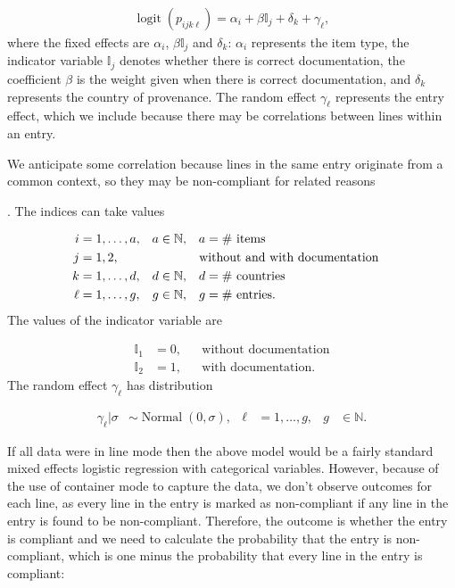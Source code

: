 \documentclass{article}
\newif\ifproofread
\newcommand{\rev}[1]{%
\ifproofread
\hl{#1}%
\else
#1%
\fi
}
\DeclareMathOperator{\logit}{logit}
\DeclareMathOperator{\Normal}{Normal}
\begin{document}
\begin{align}
\logit(p_{ijk\ell}) = \alpha_{i} + \beta\mathbb{I}_j + \delta_k + \gamma_\ell \label{eq:logit_model_sim},
\end{align}
where the fixed effects are $\alpha_i$, $\beta\mathbb{I}_j$ and $\delta_k$: $\alpha_i$ represents the item type, the indicator variable $\mathbb{I}_j$ denotes whether there is correct documentation, the coefficient $\beta$ is the weight given when there is correct documentation, and $\delta_k$ represents the country of provenance. The random effect $\gamma_\ell$ represents the entry effect, which we include because there may be correlations between lines within an entry. \rev{We anticipate some correlation because lines in the same entry originate from a common context, so they may be non-compliant for related reasons}. The indices can take values

\begin{align}
i &=1, \ldots, a, & a&\in \mathbb{N},& a &= \text{\# items}\\
j &= 1, 2, & & & &\text{\hspace{-5pt}without and with documentation}&\\
k &= 1,\ldots, d,& d &\in \mathbb{N},& d &= \text{\# countries}\\
\ell &= 1,\ldots,g,& g&\in \mathbb{N},& g &= \text{\# entries}.
\end{align}
The values of the indicator variable are

\begin{align}
\mathbb{I}_1 & = 0,& &\text{without documentation}\\
\mathbb{I}_2 &= 1,& &\text{with documentation}.
\end{align}
The random effect $\gamma_\ell$ has distribution

\begin{align}
\gamma_\ell | \sigma &\sim \Normal(0, \sigma), & \ell &= 1,\ldots, g, & g&\in \mathbb{N}.
\label{eq:entry_effect}
\end{align}

If all data were in line mode then the above model would be a fairly standard mixed effects logistic regression with categorical variables. However, because of the use of container mode to capture the data, we don't observe outcomes for each line, as every line in the entry is marked as non-compliant if any line in the entry is found to be non-compliant. Therefore, the outcome is whether the entry is compliant and we need to calculate the probability that the entry is non-compliant, which is one minus the probability that every line in the entry is compliant:
\end{document}

